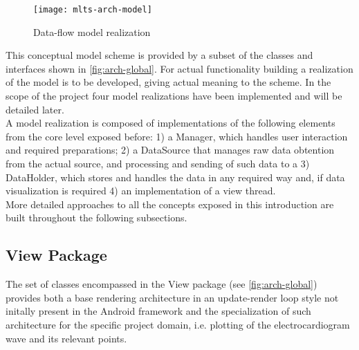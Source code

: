 		\begin{figure}[h]
		\texttt{[image: mlts-arch-model]}
		\centering
		\caption{Data-flow model realization}
		\label{fig:arch-model}
		\end{figure}

		This conceptual model scheme is provided by a subset of the classes and interfaces shown in \autoref{fig:arch-global}. For actual functionality building a realization of the model is to be developed, giving actual meaning to the scheme. In the scope of the project four model realizations have been implemented and will be detailed later.\\

		A model realization is composed of implementations of the following elements from the core level exposed before: 1) a Manager, which handles user interaction and required preparations; 2) a DataSource that manages raw data obtention from the actual source, and processing and sending of such data to a 3) DataHolder, which stores and handles the data in any required way and, if data visualization is required 4) an implementation of a view thread.\\

		More detailed approaches to all the concepts exposed in this introduction are built throughout the following subsections.

		\subsection{View Package}

		The set of classes encompassed in the View package (see \autoref{fig:arch-global}) provides both a base rendering architecture in an update-render loop style not initally present in the Android framework and the specialization of such architecture for the specific project domain, i.e. plotting of the electrocardiogram wave and its relevant points.\\

